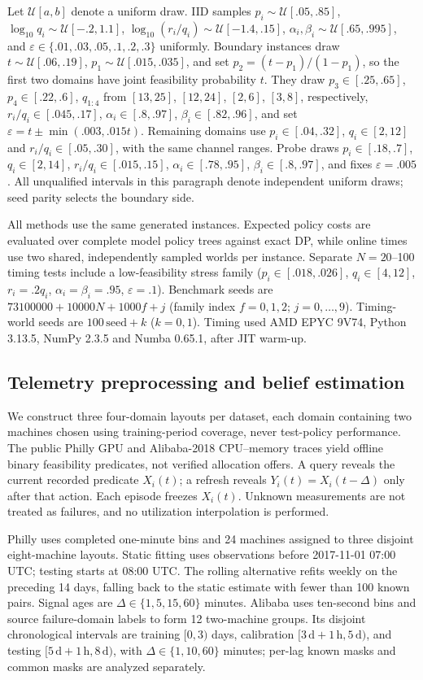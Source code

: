 \documentclass[conference]{IEEEtran}
\begin{document}
Let $\mathcal U[a,b]$ denote a uniform draw. IID samples $p_i\sim\mathcal U[.05,.85]$, $\log_{10}q_i\sim\mathcal U[-.2,1.1]$, $\log_{10}(r_i/q_i)\sim\mathcal U[-1.4,.15]$, $\alpha_i,\beta_i\sim\mathcal U[.65,.995]$, and $\varepsilon\in\{.01,.03,.05,.1,.2,.3\}$ uniformly. Boundary instances draw $t\sim\mathcal U[.06,.19]$, $p_1\sim\mathcal U[.015,.035]$, and set $p_2=(t-p_1)/(1-p_1)$, so the first two domains have joint feasibility probability $t$. They draw $p_3\in[.25,.65]$, $p_4\in[.22,.6]$, $q_{1:4}$ from $[13,25]$, $[12,24]$, $[2,6]$, $[3,8]$, respectively, $r_i/q_i\in[.045,.17]$, $\alpha_i\in[.8,.97]$, $\beta_i\in[.82,.96]$, and set $\varepsilon=t\pm\min(.003,.015t)$. Remaining domains use $p_i\in[.04,.32]$, $q_i\in[2,12]$ and $r_i/q_i\in[.05,.30]$, with the same channel ranges. Probe draws $p_i\in[.18,.7]$, $q_i\in[2,14]$, $r_i/q_i\in[.015,.15]$, $\alpha_i\in[.78,.95]$, $\beta_i\in[.8,.97]$, and fixes $\varepsilon=.005$. All unqualified intervals in this paragraph denote independent uniform draws; seed parity selects the boundary side.

All methods use the same generated instances. Expected policy costs are evaluated over complete model policy trees against exact DP, while online times use two shared, independently sampled worlds per instance. Separate $N=20$--100 timing tests include a low-feasibility stress family ($p_i\in[.018,.026]$, $q_i\in[4,12]$, $r_i=.2q_i$, $\alpha_i=\beta_i=.95$, $\varepsilon=.1$). Benchmark seeds are $73100000+10000N+1000f+j$ (family index $f=0,1,2$; $j=0,\ldots,9$). Timing-world seeds are $100\,\mathrm{seed}+k$ ($k=0,1$). Timing used AMD EPYC 9V74, Python 3.13.5, NumPy 2.3.5 and Numba 0.65.1, after JIT warm-up.

\subsection{Telemetry preprocessing and belief estimation}
We construct three four-domain layouts per dataset, each domain containing two machines chosen using training-period coverage, never test-policy performance. The public Philly GPU and Alibaba-2018 CPU--memory traces yield offline binary feasibility predicates, not verified allocation offers. A query reveals the current recorded predicate $X_i(t)$; a refresh reveals $Y_i(t)=X_i(t-\Delta)$ only after that action. Each episode freezes $X_i(t)$. Unknown measurements are not treated as failures, and no utilization interpolation is performed.

Philly uses completed one-minute bins and 24 machines assigned to three disjoint eight-machine layouts. Static fitting uses observations before 2017-11-01 07:00 UTC; testing starts at 08:00 UTC. The rolling alternative refits weekly on the preceding 14 days, falling back to the static estimate with fewer than 100 known pairs. Signal ages are $\Delta\in\{1,5,15,60\}$ minutes. Alibaba uses ten-second bins and source failure-domain labels to form 12 two-machine groups. Its disjoint chronological intervals are training $[0,3)$ days, calibration $[3\,\mathrm d+1\,\mathrm h,5\,\mathrm d)$, and testing $[5\,\mathrm d+1\,\mathrm h,8\,\mathrm d)$, with $\Delta\in\{1,10,60\}$ minutes; per-lag known masks and common masks are analyzed separately.
\end{document}
